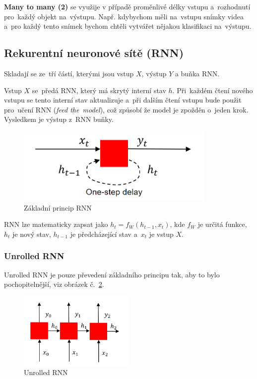 \textbf{Many to many (2)} se využije v případě proměnlivé délky vstupu a~rozhodnutí pro~každý objekt na~výstupu.
Např. kdybychom měli na~vstupu snímky videa a~pro každý tento snímek bychom chtěli vytvářet nějakou klasifikaci na~výstupu.

\subsection{Rekurentní neuronové sítě (RNN)}

Skladají se ze~tří částí, kterými jsou vstup $X$, výstup $Y$ a buňka RNN.

Vstup $X$ se~předá RNN, který má skrytý interní stav $h$.
Při~každém čtení nového vstupu se tento interní stav aktualizuje a~při dalším čtení vstupu bude  použit pro~učení RNN (\emph{feed the~model}), což způsobí že model je zpožděn o~jeden krok.
Vysledkem je výstup z~RNN buňky.

\begin{figure}[h]
    \centering
	\includegraphics[height=10em]{images/09_RNN.png}
    \caption{Základní princip RNN}
    \label{RNN}
\end{figure}

RNN lze matematicky zapsat jako $h_t = f_W(h_{t-1},x_t)$, kde $f_W$ je určitá funkce, $h_t$ je nový stav, $h_{t-1}$ je předcházející stav a~$x_t$ je vstup $X$.

\subsubsection{Unrolled RNN}

Unrolled RNN je pouze převedení základního principu tak, aby to bylo pochopitelnější, viz obrázek č.~\ref{unrolledRNN}.

\begin{figure}[h]
    \centering
	\includegraphics[height=10em]{images/09_unrolled-RNN.png}
    \caption{Unrolled RNN}
    \label{unrolledRNN}
\end{figure}

